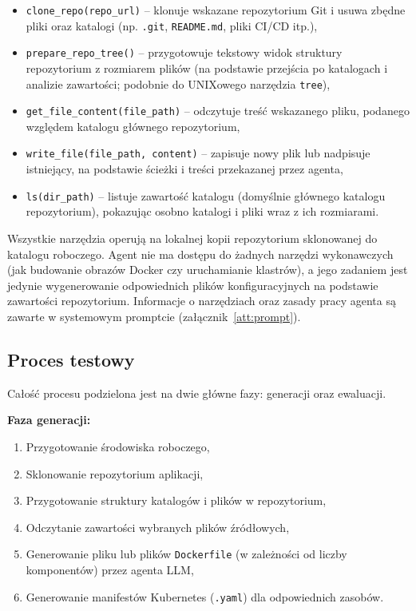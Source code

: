 \begin{itemize}
    \item \texttt{clone\_repo(repo\_url)} – klonuje wskazane repozytorium Git i usuwa zbędne pliki oraz katalogi (np. \texttt{.git}, \texttt{README.md}, pliki CI/CD itp.),
    
    \item \texttt{prepare\_repo\_tree()} – przygotowuje tekstowy widok struktury repozytorium z rozmiarem plików (na podstawie przejścia po katalogach i analizie zawartości; podobnie do UNIXowego narzędzia \texttt{tree}),
    
    \item \texttt{get\_file\_content(file\_path)} – odczytuje treść wskazanego pliku, podanego względem katalogu głównego repozytorium,
    
    \item \texttt{write\_file(file\_path, content)} – zapisuje nowy plik lub nadpisuje istniejący, na podstawie ścieżki i treści przekazanej przez agenta,
    
    \item \texttt{ls(dir\_path)} – listuje zawartość katalogu (domyślnie głównego katalogu repozytorium), pokazując osobno katalogi i pliki wraz z ich rozmiarami.
\end{itemize}

Wszystkie narzędzia operują na lokalnej kopii repozytorium sklonowanej do katalogu roboczego. Agent nie ma dostępu do żadnych narzędzi wykonawczych (jak budowanie obrazów Docker czy uruchamianie klastrów), a jego zadaniem jest jedynie wygenerowanie odpowiednich plików konfiguracyjnych na podstawie zawartości repozytorium. Informacje o narzędziach oraz zasady pracy agenta są zawarte w systemowym promptcie (załącznik~\ref{att:prompt}).

\subsection{Proces testowy}

Całość procesu podzielona jest na dwie główne fazy: generacji oraz ewaluacji.  

\noindent
\textbf{Faza generacji:}

\begin{enumerate}
    \item Przygotowanie środowiska roboczego,
    \item Sklonowanie repozytorium aplikacji,
    \item Przygotowanie struktury katalogów i plików w repozytorium,
    \item Odczytanie zawartości wybranych plików źródłowych,
    \item Generowanie pliku lub plików \texttt{Dockerfile} (w zależności od liczby komponentów) przez agenta LLM,
    \item Generowanie manifestów Kubernetes (\texttt{.yaml}) dla odpowiednich zasobów.
\end{enumerate}

